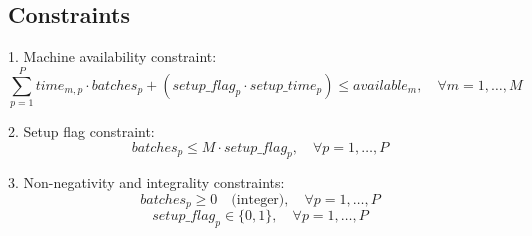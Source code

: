 \documentclass{article}
\begin{document}
\subsection*{Constraints}
1. Machine availability constraint:
\[
\sum_{p=1}^{P} time_{m,p} \cdot batches_{p} + (setup\_flag_{p} \cdot setup\_time_{p}) \leq available_{m}, \quad \forall m = 1, \ldots, M
\]

2. Setup flag constraint:
\[
batches_{p} \leq M \cdot setup\_flag_{p}, \quad \forall p = 1, \ldots, P
\]

3. Non-negativity and integrality constraints:
\[
batches_{p} \geq 0 \quad \text{(integer)}, \quad \forall p = 1, \ldots, P
\]
\[
setup\_flag_{p} \in \{0, 1\}, \quad \forall p = 1, \ldots, P
\]
\end{document}
